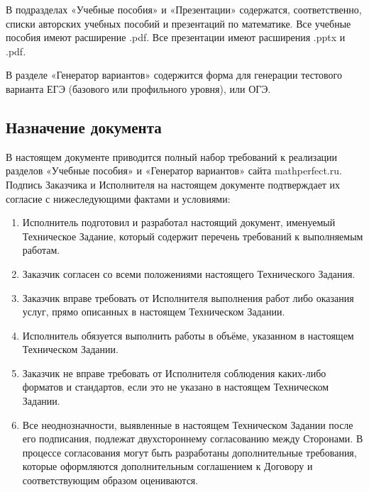 В подразделах «Учебные пособия» и «Презентации» содержатся, соответственно, списки авторских учебных пособий и презентаций по математике. Все учебные пособия имеют расширение .pdf. Все презентации имеют расширения .pptx и .pdf.

В разделе «Генератор вариантов» содержится форма для генерации тестового варианта ЕГЭ (базового или профильного уровня), или ОГЭ.

\subsection{Назначение документа}
В настоящем документе приводится полный набор требований к реализации разделов «Учебные пособия» и «Генератор вариантов» сайта mathperfect.ru.
Подпись Заказчика и Исполнителя на настоящем документе подтверждает их согласие с нижеследующими фактами и условиями:
\begin{enumerate}
  \item Исполнитель подготовил и разработал настоящий документ, именуемый Техническое Задание, который содержит перечень требований к выполняемым работам.
  \item Заказчик согласен со всеми положениями настоящего Технического Задания.
  \item Заказчик вправе требовать от Исполнителя выполнения работ либо оказания услуг, прямо описанных в настоящем Техническом Задании.
  \item Исполнитель обязуется выполнить работы в объёме, указанном в настоящем Техническом Задании.
  \item Заказчик не вправе требовать от Исполнителя соблюдения каких-либо форматов и стандартов, если это не указано в настоящем Техническом Задании.
  \item Все неоднозначности, выявленные в настоящем Техническом Задании после его подписания, подлежат двухстороннему согласованию между Сторонами. В процессе согласования могут быть разработаны дополнительные требования, которые оформляются дополнительным соглашением к Договору и соответствующим образом оцениваются.
\end{enumerate}
